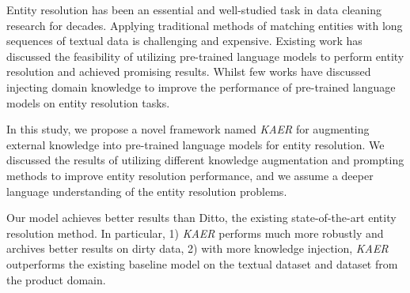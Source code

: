 
Entity resolution has been an essential and well-studied task in data cleaning research for decades. Applying traditional methods of matching entities with long sequences of textual data is challenging and expensive. Existing work has discussed the feasibility of utilizing pre-trained language models to perform entity resolution and achieved promising results. Whilst few works have discussed injecting domain knowledge to improve the performance of pre-trained language models on entity resolution tasks. 

In this study, we propose a novel framework named \textit{KAER} for augmenting external knowledge into pre-trained language models for entity resolution. We discussed the results of utilizing different knowledge augmentation and prompting methods to improve entity resolution performance, and we assume a deeper language understanding of the entity resolution problems. 

Our model achieves better results than Ditto, the existing state-of-the-art entity resolution method. In particular, 1) \textit{KAER} performs much more robustly and archives better results on dirty data, 2) with more knowledge injection, \textit{KAER} outperforms the existing baseline model on the textual dataset and dataset from the product domain. 

